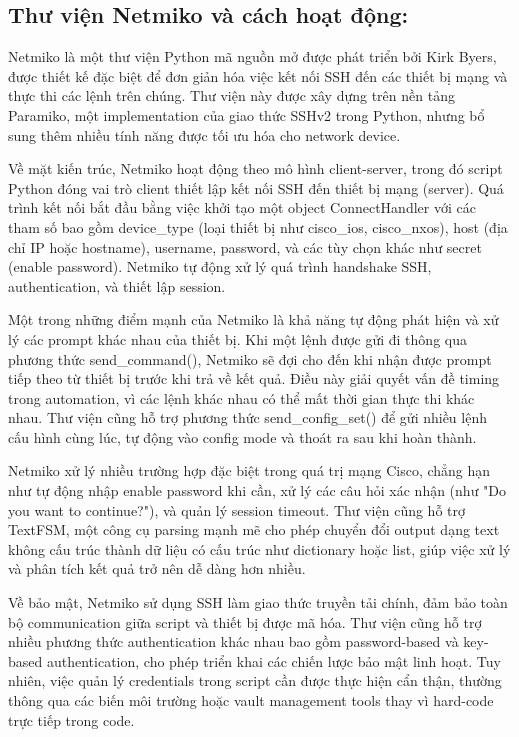 \subsection{Thư viện Netmiko và cách hoạt động:}
    Netmiko là một thư viện Python mã nguồn mở được phát triển bởi Kirk Byers, được thiết kế đặc biệt để đơn giản hóa việc kết nối SSH đến các thiết bị mạng và thực thi các lệnh trên chúng. Thư viện này được xây dựng trên nền tảng Paramiko, một implementation của giao thức SSHv2 trong Python, nhưng bổ sung thêm nhiều tính năng được tối ưu hóa cho network device.

    Về mặt kiến trúc, Netmiko hoạt động theo mô hình client-server, trong đó script Python đóng vai trò client thiết lập kết nối SSH đến thiết bị mạng (server). Quá trình kết nối bắt đầu bằng việc khởi tạo một object ConnectHandler với các tham số bao gồm device\_type (loại thiết bị như cisco\_ios, cisco\_nxos), host (địa chỉ IP hoặc hostname), username, password, và các tùy chọn khác như secret (enable password). Netmiko tự động xử lý quá trình handshake SSH, authentication, và thiết lập session\cite{Python-Automation-Book}.

    Một trong những điểm mạnh của Netmiko là khả năng tự động phát hiện và xử lý các prompt khác nhau của thiết bị. Khi một lệnh được gửi đi thông qua phương thức send\_command(), Netmiko sẽ đợi cho đến khi nhận được prompt tiếp theo từ thiết bị trước khi trả về kết quả. Điều này giải quyết vấn đề timing trong automation, vì các lệnh khác nhau có thể mất thời gian thực thi khác nhau. Thư viện cũng hỗ trợ phương thức send\_config\_set() để gửi nhiều lệnh cấu hình cùng lúc, tự động vào config mode và thoát ra sau khi hoàn thành.

    Netmiko xử lý nhiều trường hợp đặc biệt trong quá trị mạng Cisco, chẳng hạn như tự động nhập enable password khi cần, xử lý các câu hỏi xác nhận (như "Do you want to continue?"), và quản lý session timeout. Thư viện cũng hỗ trợ TextFSM, một công cụ parsing mạnh mẽ cho phép chuyển đổi output dạng text không cấu trúc thành dữ liệu có cấu trúc như dictionary hoặc list, giúp việc xử lý và phân tích kết quả trở nên dễ dàng hơn nhiều.
    
    Về bảo mật, Netmiko sử dụng SSH làm giao thức truyền tải chính, đảm bảo toàn bộ communication giữa script và thiết bị được mã hóa. Thư viện cũng hỗ trợ nhiều phương thức authentication khác nhau bao gồm password-based và key-based authentication, cho phép triển khai các chiến lược bảo mật linh hoạt. Tuy nhiên, việc quản lý credentials trong script cần được thực hiện cẩn thận, thường thông qua các biến môi trường hoặc vault management tools thay vì hard-code trực tiếp trong code\cite{NetworkJourney-Netmiko-2024}.
